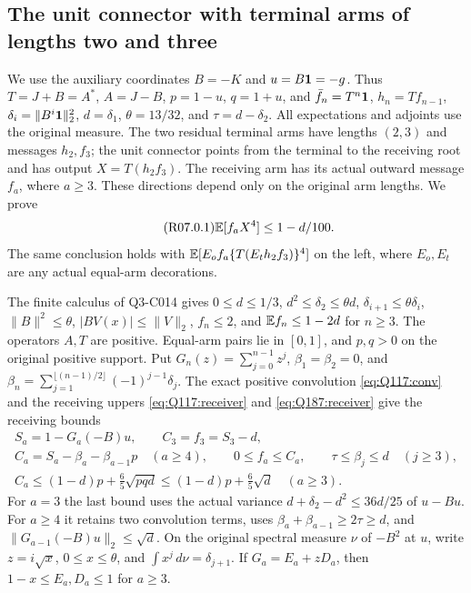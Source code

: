 \subsection{The unit connector with terminal arms of lengths two and three}\label{proof:R2-C007}
We use the auxiliary coordinates $B=-K$ and $u=B\mathbf1=-g$. Thus
$T=J+B=A^*$, $A=J-B$, $p=1-u$, $q=1+u$, and
$\bar f_n=T^n\mathbf1$, $h_n=Tf_{n-1}$, $\delta_i=\|B^i\mathbf1\|_2^2$,
$d=\delta_1$, $\theta=13/32$, and $\tau=d-\delta_2$.
All expectations and adjoints use the original measure. The two residual
terminal arms have lengths $(2,3)$ and messages $h_2,f_3$; the unit
connector points from the terminal to the receiving root and has output
$X=T(h_2f_3)$. The receiving arm has its actual outward message $f_a$,
where $a\ge3$. These directions depend only on the original arm lengths.
We prove
\begin{equation}\tag{R07.0.1}\label{eq:R07:claim}
 \mathbb E[f_aX^4]\le1-d/100.
\end{equation}
The same conclusion holds with $\mathbb E[E_of_a\{T(E_th_2f_3)\}^4]$ on the left,
where $E_o,E_t$ are any actual equal-arm decorations.

The finite calculus of Q3-C014 gives
$0\le d\le1/3$, $d^2\le\delta_2\le\theta d$,
$\delta_{i+1}\le\theta\delta_i$, $\|B\|^2\le\theta$,
$|BV(x)|\le\|V\|_2$, $f_n\le2$, and $\mathbb E f_n\le1-2d$ for $n\ge3$.
The operators $A,T$ are positive. Equal-arm pairs lie in $[0,1]$,
and $p,q>0$ on the original positive support.
Put $G_n(z)=\sum_{j=0}^{n-1}z^j$, $\beta_1=\beta_2=0$, and
$\beta_n=\sum_{j=1}^{\lfloor(n-1)/2\rfloor}(-1)^{j-1}\delta_j$.
The exact positive convolution \eqref{eq:Q117:conv} and the receiving uppers
\eqref{eq:Q117:receiver} and \eqref{eq:Q187:receiver} give the receiving bounds
\begin{equation}\tag{R07.1.1}\label{eq:R07:receiving}
 \begin{gathered}
 S_a=1-G_a(-B)u,\qquad C_3=f_3=S_3-d,\\
 C_a=S_a-\beta_a-\beta_{a-1}p\quad(a\ge4),\qquad
 0\le f_a\le C_a,\qquad \tau\le\beta_j\le d\quad(j\ge3),\\
 C_a\le(1-d)p+\tfrac65\sqrt{pqd}
       \le(1-d)p+\tfrac65\sqrt d\quad(a\ge3).
 \end{gathered}
\end{equation}
For $a=3$ the last bound uses the actual variance
$d+\delta_2-d^2\le36d/25$ of $u-Bu$. For $a\ge4$ it retains two
convolution terms, uses $\beta_a+\beta_{a-1}\ge2\tau\ge d$, and
$\|G_{a-1}(-B)u\|_2\le\sqrt d$.
On the original spectral measure $\nu$ of $-B^2$ at $u$, write
$z=i\sqrt x$, $0\le x\le\theta$, and
$\int x^j\,d\nu=\delta_{j+1}$. If $G_a=E_a+zD_a$, then
$1-x\le E_a,D_a\le1$ for $a\ge3$.


